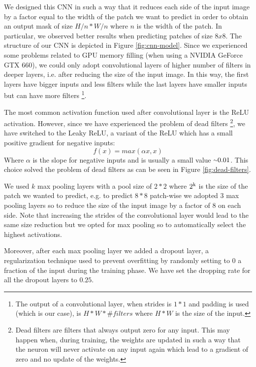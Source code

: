 \documentclass[10pt,conference,compsocconf]{IEEEtran}
\begin{document}
We designed this CNN in such a way that it reduces each side of the input image by a factor equal to the width of the patch we want to predict in order to obtain an output mask of size $H/n*W/n$ where $n$ is the width of the patch. In particular, we observed better results when predicting patches of size $8x8$. The structure of our CNN is depicted in Figure \ref{fig:cnn-model}. Since we experienced some problems related to GPU memory filling (when using a NVIDIA GeForce GTX 660), we could only adopt convolutional layers of higher number of filters in deeper layers, i.e. after reducing the size of the input image. In this way, the first layers have bigger inputs and less filters while the last layers have smaller inputs but can have more filters \footnote{The output of a convolutional layer, when strides is $1*1$ and padding is used (which is our case), is $H * W * \#filters$ where $H*W$ is the size of the input.}.

The most common activation function used after convolutional layer is the ReLU activation. However, since we have experienced the problem of dead filters \footnote{Dead filters are filters that always output zero for any input. This may happen when, during training, the weights are updated in such a way that the neuron will never activate on any input again which lead to a gradient of zero and no update of the weights.}, we have switched to the Leaky ReLU, a variant of the ReLU which has a small positive gradient for negative inputs:
$$f(x)=max(\alpha x, x)$$
Where $\alpha$ is the slope for negative inputs and is usually a small value ${\raise.17ex\hbox{$\scriptstyle\sim$}}0.01$.
This choice solved the problem of dead filters as can be seen in Figure \ref{fig:dead-filters}.

We used $k$ max pooling layers with a pool size of $2*2$ where $2\textsuperscript{k}$ is the size of the patch we wanted to predict, e.g. to predict $8*8$ patch-wise we adopted 3 max pooling layers so to reduce the size of the input image by a factor of 8 on each side. Note that increasing the strides of the convolutional layer would lead to the same size reduction but we opted for max pooling so to automatically select the highest activations.

Moreover, after each max pooling layer we added a dropout layer, a regularization technique used to prevent overfitting by randomly setting to 0 a fraction of the input during the training phase. We have set the dropping rate for all the dropout layers to $0.25$.
\end{document}
